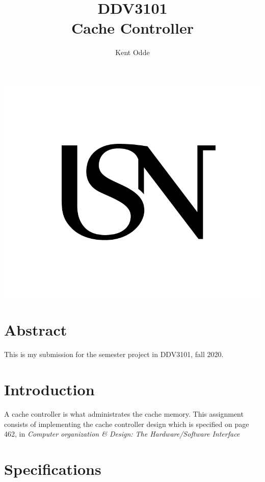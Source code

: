 \documentclass{article}
\begin{document}
\author{Kent Odde}
\title{DDV3101 \\Cache Controller}

\maketitle
\thispagestyle{empty}
\begin{center}
\includegraphics[width=\linewidth,height=0.2\textheight,keepaspectratio]{img/USN.png}
\end{center}
\newpage

\tableofcontents

\newpage

\section{Abstract}

This is my submission for the semester project in DDV3101, fall 2020.

\section{Introduction}
A cache controller is what administrates the cache memory. This assignment consists of implementing the cache controller design which is specified on page 462, in \textit{Computer organization \& Design: The Hardware/Software Interface}\cite{BOOK}

\section{Specifications}
\end{document}
